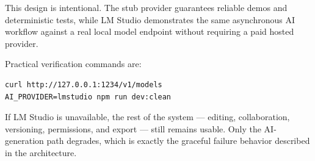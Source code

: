 This design is intentional. The stub provider guarantees reliable demos and deterministic tests, while
LM Studio demonstrates the same asynchronous AI workflow against a real local model endpoint without
requiring a paid hosted provider.

Practical verification commands are:

\begin{lstlisting}[language={}]
curl http://127.0.0.1:1234/v1/models
AI_PROVIDER=lmstudio npm run dev:clean
\end{lstlisting}

If LM Studio is unavailable, the rest of the system --- editing, collaboration, versioning, permissions,
and export --- still remains usable. Only the AI-generation path degrades, which is exactly the graceful
failure behavior described in the architecture.
